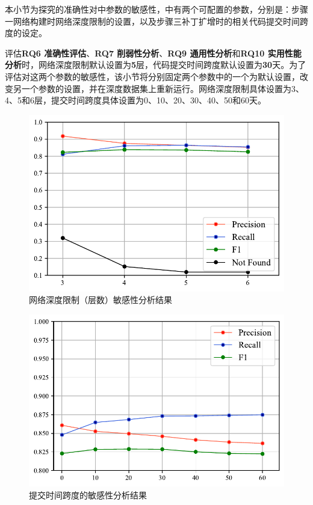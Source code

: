 本小节为探究\tool 的准确性对\tool 中参数的敏感性，\tool 中有两个可配置的参数，分别是：\tool 步骤一网络构建时网络深度限制的设置，以及步骤三补丁扩增时的相关代码提交时间跨度的设定。

评估\textbf{RQ6 准确性评估}、\textbf{RQ7 削弱性分析}、\textbf{RQ9 通用性分析}和\textbf{RQ10 实用性能分析}时，网络深度限制默认设置为\textbf{5}层，代码提交时间跨度默认设置为\textbf{30}天。为了评估\tool 对这两个参数的敏感性，该小节将分别固定两个参数中的一个为默认设置，改变另一个参数的设置，并在深度数据集上重新运行\tool 。网络深度限制具体设置为3、4、5和6层，提交时间跨度具体设置为0、10、20、30、40、50和60天。
\begin{figure}[h]
    \centering
    \includegraphics[scale=1.0]{fig/rq8-sensitivity-depth.pdf}
    \caption{网络深度限制（层数）敏感性分析结果}\label{fig:depth}
\end{figure}

\begin{figure}[h]
    \centering
    \includegraphics[scale=1.0]{fig/rq8-sensitivity-span.pdf}
    \caption{提交时间跨度的敏感性分析结果}\label{fig:span}
\end{figure}


